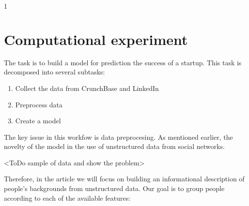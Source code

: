 \documentclass[12pt]{article}
\theoremstyle{plain}
\theoremstyle{definition}
\begin{document}




1

\section{Computational experiment}

The task is to build a model for prediction the success of a startup. This task is decomposed into several subtasks:

\begin{enumerate}
    \item Collect the data from CrunchBase and LinkedIn
    \item Preprocess data
    \item Create a model
\end{enumerate}

The key issue in this workfow is data preprocesing. As mentioned earlier, the novelty of the model in the use of unstructured data from social networks. 

<ToDo sample of data and show the problem>

Therefore, in the article we will focus on building an informational description of people's backgrounds from unstructured data. Our goal is to group people according to each of the available features:
\end{document}
